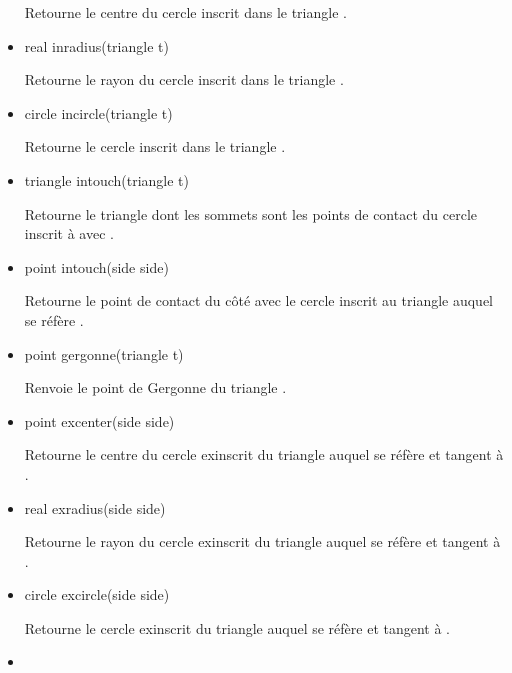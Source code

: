 \documentclass[pdftex]{article}
\begin{document}
\begin{itemize}
\begin{Vcolor}
  \end{Vcolor}
  Retourne le centre du cercle inscrit dans le triangle .
\item {}
  \begin{Vcolor}
    real inradius(triangle t)
  \end{Vcolor}
  Retourne le rayon du cercle inscrit dans le triangle .
\item {}
  \begin{Vcolor}
    circle incircle(triangle t)
  \end{Vcolor}
  Retourne le cercle inscrit dans le triangle .
\item {}
  \begin{Vcolor}
    triangle intouch(triangle t)
  \end{Vcolor}
  Retourne le triangle dont les sommets sont les points de contact du
  cercle inscrit à  avec .
\item {}
  \begin{Vcolor}
    point intouch(side side)
  \end{Vcolor}
  Retourne le point de contact du côté  avec le cercle
  inscrit au triangle auquel se réfère .
\item {}
  \begin{Vcolor}
    point gergonne(triangle t)
  \end{Vcolor}
  Renvoie le point de {\sc Gergonne} du triangle .
\item {}
  \begin{Vcolor}
    point excenter(side side)
  \end{Vcolor}
  Retourne le centre du cercle exinscrit du triangle auquel se réfère 
  et tangent à .
\item {}
  \begin{Vcolor}
    real exradius(side side)
  \end{Vcolor}
  Retourne le rayon du cercle exinscrit du triangle auquel se réfère 
  et tangent à .
\item {}
  \begin{Vcolor}
    circle excircle(side side)
  \end{Vcolor}
  Retourne le cercle exinscrit du triangle auquel se réfère 
  et tangent à .
\item {}

\end{itemize}
\end{document}
